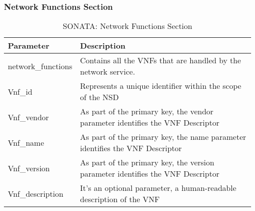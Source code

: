 \subsubsection{Network Functions Section}
    \begin{table}[h]
    \centering
    \begin{tabular}{ |p{4cm}|p{10cm}|}
        \hline
        \textbf{Parameter} & \textbf{Description} \\
        \hline
         
         network\_functions & Contains all the VNFs that are handled by the network service. \\
         \hline
         Vnf\_id & Represents a unique identifier within the scope of the NSD \\
         \hline
         Vnf\_vendor & As part of the primary key, the vendor parameter identifies the VNF Descriptor \\
         \hline
         Vnf\_name & As part of the primary key, the name parameter identifies the VNF Descriptor \\
         \hline
         Vnf\_version & As part of the primary key, the version parameter identifies the VNF Descriptor\\
         \hline
         Vnf\_description & It's an optional parameter, a human-readable description of the VNF\\
         \hline
    \end{tabular}
    \caption{SONATA: Network Functions Section}
    \label{tab:SONATA_NF_section}
 \end{table}
